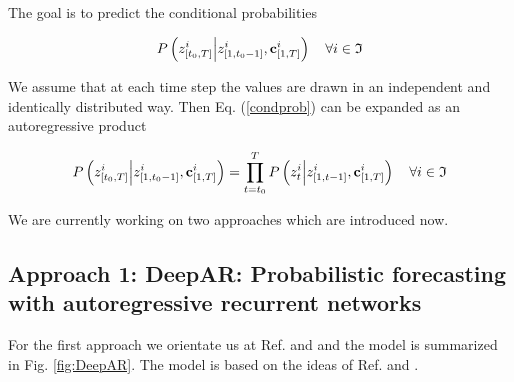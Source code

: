 \documentclass[11pt,headings=small]{scrartcl}
\begin{document}
The goal is to predict the conditional probabilities

\begin{equation}\label{condprob}
P \left( z^{i}_{[t_{0},T]} \Big| z^{i}_{[1,t_{0}-1]} , \textbf{c}^{i}_{[1,T]} \right) \quad \forall i \in \frak{I}
\end{equation}

We assume that at each time step the values are drawn in an independent and identically distributed way. Then Eq. (\ref{condprob}) can be expanded as an autoregressive product

\begin{equation}\label{condprobiid}
P \left( z^{i}_{[t_{0},T]} \Big| z^{i}_{[1,t_{0}-1]} , \textbf{c}^{i}_{[1,T]} \right) = \prod_{t=t_{0}}^{T} P \left( z^{i}_{t} \Big| z^{i}_{[1,t-1]} , \textbf{c}^{i}_{[1,T]} \right) \quad \forall i \in \frak{I}
\end{equation}


We are currently working on two approaches which are introduced now.

\subsection{Approach 1: DeepAR: Probabilistic forecasting with autoregressive recurrent networks}
\label{subsection:deepar}

For the first approach we orientate us at Ref. \cite{SALINAS20201181} and \cite{DBLP:journals/corr/abs-1906-05264} and the model is summarized in Fig. \ref{fig:DeepAR}. The model is based on the ideas of Ref. \cite{DBLP:journals/corr/Graves13} and \cite{DBLP:journals/corr/SutskeverVL14}.
\end{document}
